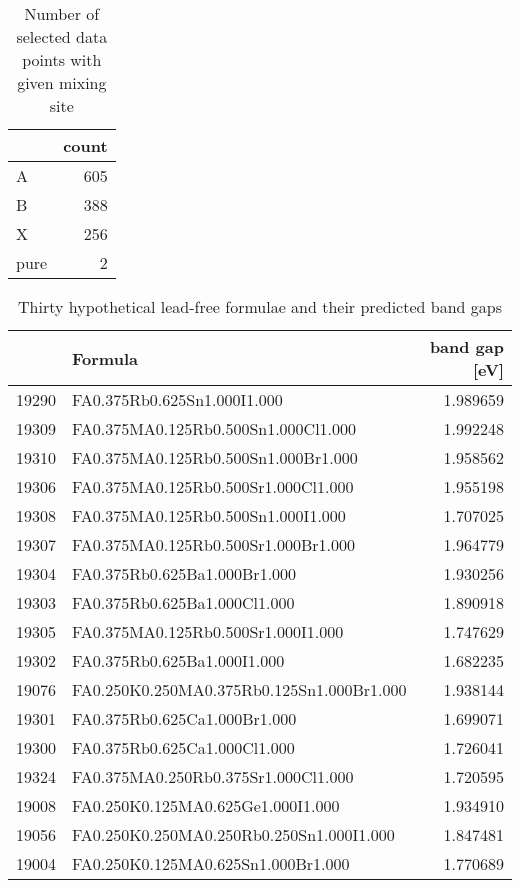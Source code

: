  
\begin{table}[htbp]
\caption{\label{tbl:mixscreen} Number of selected data points with given mixing site}
\centering
\begin{tabular}{lr}
 & count\\[0pt]
\hline
A & 605\\[0pt]
B & 388\\[0pt]
X & 256\\[0pt]
pure & 2\\[0pt]
\end{tabular}
\end{table}

 
\begin{table}[htbp]
\caption{\label{tbl:pbfree} Thirty hypothetical lead-free formulae and their predicted band gaps}
\centering
\begin{tabular}{rlr}
 & Formula & band gap [eV]\\[0pt]
\hline
19290 & FA0.375Rb0.625Sn1.000I1.000 & 1.989659\\[0pt]
19309 & FA0.375MA0.125Rb0.500Sn1.000Cl1.000 & 1.992248\\[0pt]
19310 & FA0.375MA0.125Rb0.500Sn1.000Br1.000 & 1.958562\\[0pt]
19306 & FA0.375MA0.125Rb0.500Sr1.000Cl1.000 & 1.955198\\[0pt]
19308 & FA0.375MA0.125Rb0.500Sn1.000I1.000 & 1.707025\\[0pt]
19307 & FA0.375MA0.125Rb0.500Sr1.000Br1.000 & 1.964779\\[0pt]
19304 & FA0.375Rb0.625Ba1.000Br1.000 & 1.930256\\[0pt]
19303 & FA0.375Rb0.625Ba1.000Cl1.000 & 1.890918\\[0pt]
19305 & FA0.375MA0.125Rb0.500Sr1.000I1.000 & 1.747629\\[0pt]
19302 & FA0.375Rb0.625Ba1.000I1.000 & 1.682235\\[0pt]
19076 & FA0.250K0.250MA0.375Rb0.125Sn1.000Br1.000 & 1.938144\\[0pt]
19301 & FA0.375Rb0.625Ca1.000Br1.000 & 1.699071\\[0pt]
19300 & FA0.375Rb0.625Ca1.000Cl1.000 & 1.726041\\[0pt]
19324 & FA0.375MA0.250Rb0.375Sr1.000Cl1.000 & 1.720595\\[0pt]
19008 & FA0.250K0.125MA0.625Ge1.000I1.000 & 1.934910\\[0pt]
19056 & FA0.250K0.250MA0.250Rb0.250Sn1.000I1.000 & 1.847481\\[0pt]
19004 & FA0.250K0.125MA0.625Sn1.000Br1.000 & 1.770689\\[0pt]

\end{tabular}
\end{table}
